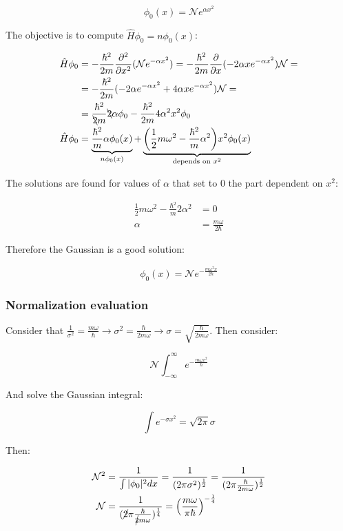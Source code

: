   $$\phi_0(x) = \mathcal{N} e^{\alpha x^2}$$

  The objective is to compute $\hat{H}\phi_0 = n\phi_0(x)$:

  \begin{align*}
    \hat{H}\phi_0 &= -\frac{\hbar^2}{2m}\frac{\partial^2}{\partial x^2}(\mathcal{N}e^{-\alpha x^2}) = -\frac{\hbar^2}{2m}\frac{\partial}{\partial x}(-2\alpha x e^{-\alpha x^2})\mathcal{N}=\\
                  &=-\frac{\hbar^2}{2m}(-2\alpha e^{-\alpha x^2}+4\alpha xe^{-\alpha x^2})\mathcal{N}=\\
                  &= \frac{\hbar^2}{\bcancel{2}m}\bcancel{2}\alpha\phi_0 -\frac{\hbar^2}{2m}4\alpha^2 x^2\phi_0\\
    \hat{H}\phi_0 &= \underbrace{\frac{\hbar^2}{m}\alpha\phi_0(x)}_{n\phi_0(x)} + \underbrace{\biggl(\frac{1}{2}m\omega^2-\frac{\hbar^2}{m}\alpha^2\biggr)x^2\phi_0(x)}_{\text{depends on }x^2}
  \end{align*}

  The solutions are found for values of $\alpha$ that set to $0$ the part dependent on $x^2$:

  \begin{align*}
    \frac{1}{2}m\omega^2 -\frac{\hbar^2}{m}2\alpha^2 &= 0\\
    \alpha &= \frac{m\omega}{2\hbar}
  \end{align*}

  Therefore the Gaussian is a good solution:

  $$\phi_0(x) = \mathcal{N}e^{-\frac{m\omega^2x}{2\hbar}}$$

    \subsubsection{Normalization evaluation}
    Consider that $\frac{1}{\sigma^2} = \frac{m\omega}{\hbar} \rightarrow \sigma^2 = \frac{\hbar}{2m\omega}\rightarrow \sigma = \sqrt{\frac{\hbar}{2m\omega}}$.
    Then consider:

    $$\mathcal{N}\int_{-\infty}^\infty e^{-\frac{m\omega x^2}{\hbar}}$$

    And solve the Gaussian integral:

    $$\int e^{-\sigma x^2} = \sqrt{2\pi}\sigma$$

    Then:

    \begin{align*}
      \mathcal{N}^2 &= \frac{1}{\int|\phi_0|^2dx} = \frac{1}{(2\pi\sigma^2)^{\frac{1}{2}}} = \frac{1}{(2\pi\frac{\hbar}{2m\omega})^\frac{1}{2}}\\
      \mathcal{N} &= \frac{1}{(\cancel{2}\pi\frac{\hbar}{\cancel{2}m\omega})^{\frac{1}{4}}} = \left(\frac{m\omega}{\pi\hbar}\right)^{-\frac{1}{4}}
    \end{align*}

